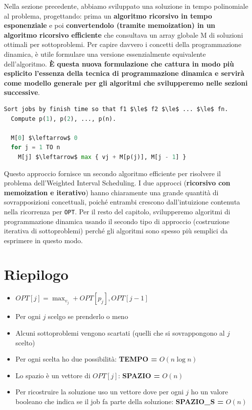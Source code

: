 Nella sezione precedente, abbiamo sviluppato una soluzione in tempo
polinomiale al problema, progettando: prima un \textbf{algoritmo
      ricorsivo in tempo esponenziale} e poi \textbf{convertendolo (tramite
      memoization) in un algoritmo ricorsivo efficiente} che consultava un
array globale M di soluzioni ottimali per sottoproblemi. Per capire
davvero i concetti della programmazione dinamica, è utile formulare una
versione essenzialmente equivalente dell'algoritmo. \textbf{È questa
      nuova formulazione che cattura in modo più esplicito l'essenza della
      tecnica di programmazione dinamica e servirà come modello generale per
      gli algoritmi che svilupperemo nelle sezioni successive}.

\begin{lstlisting}[language=Python, mathescape=true]
Sort jobs by finish time so that f1 $\le$ f2 $\le$ ... $\le$ fn. 
  Compute p(1), p(2), ..., p(n).
  
  M[0] $\leftarrow$ 0
  for j = 1 TO n
    M[j] $\leftarrow$ max { vj + M[p(j)], M[j - 1] }
\end{lstlisting}

Questo approccio fornisce un secondo algoritmo efficiente per risolvere
il problema dell'Weighted Interval Scheduling. I due approcci
(\textbf{ricorsivo con memoization e iterativo}) hanno chiaramente una
grande quantità di sovrapposizioni concettuali, poiché entrambi crescono
dall'intuizione contenuta nella ricorrenza per \texttt{OPT}. Per il
resto del capitolo, svilupperemo algoritmi di programmazione dinamica
usando il secondo tipo di approccio (costruzione iterativa di
sottoproblemi) perché gli algoritmi sono spesso più semplici da
esprimere in questo modo.

\section{Riepilogo}

\begin{itemize}
      \item
            $OPT[j] = \max_{v_j}+OPT[p_j],OPT[j-1]$
      \item
            Per ogni $j$ scelgo se prenderlo o meno
      \item
            Alcuni sottoproblemi vengono scartati (quelli che si sovrappongono al
            $j$ scelto)
      \item
            Per ogni scelta ho due possibilità: \textbf{TEMPO =} $O(n \log n)$
      \item
            Lo spazio è un vettore di $OPT[j]$: \textbf{SPAZIO =} $O(n)$
      \item
            Per ricostruire la soluzione uso un vettore dove per ogni $j$ ho un
            valore booleano che indica se il job fa parte della soluzione:
            \textbf{SPAZIO\_S =} $O(n)$
\end{itemize}
